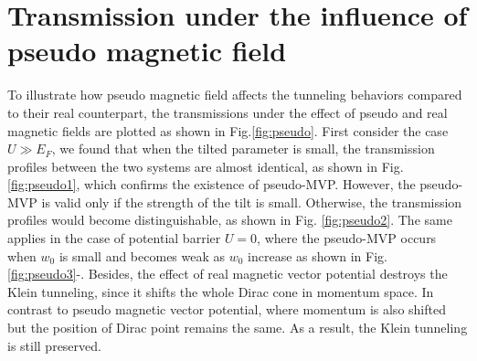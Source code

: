    
\section{Transmission under the influence of pseudo magnetic field}
    To illustrate how pseudo magnetic field affects the tunneling behaviors compared to their real counterpart,
    the transmissions under the effect of pseudo and real magnetic fields are plotted as shown in Fig.\ref{fig:pseudo}.
    First consider the case $U \gg E_F$, we found that when the tilted parameter is small, the transmission profiles between the two systems are almost identical, as shown in Fig. \ref{fig:pseudo1}, which confirms the existence of pseudo-MVP. 
    However, the pseudo-MVP is valid only if the strength of the tilt is small. 
    Otherwise, the transmission profiles would become distinguishable, as shown in Fig. \ref{fig:pseudo2}. 
    The same applies in the case of potential barrier $U=0$, where the pseudo-MVP occurs when $w_0$ is small and becomes weak as $w_0$ increase as shown in Fig. \ref{fig:pseudo3}-. 
    Besides, the effect of real magnetic vector potential destroys the Klein tunneling, since it shifts the whole Dirac cone in momentum space. 
    In contrast to pseudo magnetic vector potential, where momentum is also shifted but the position of Dirac point remains the same. 
    As a result, the Klein tunneling is still preserved.

